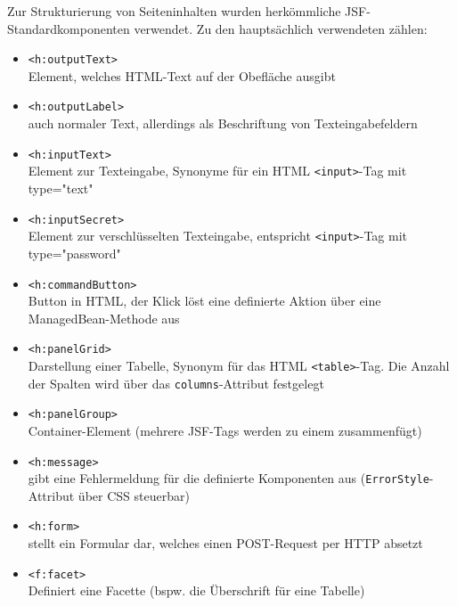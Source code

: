 Zur Strukturierung von Seiteninhalten wurden herkömmliche \ac{JSF}-Standardkomponenten verwendet.
Zu den hauptsächlich verwendeten zählen:
\begin{itemize}
  \item \texttt{<h:outputText>}\\
    Element, welches HTML-Text auf der Obefläche ausgibt 
  
  \item \texttt{<h:outputLabel>}\\
    auch normaler Text, allerdings als Beschriftung von Texteingabefeldern
      
  \item \texttt{<h:inputText>}\\
    Element zur Texteingabe, Synonyme für ein HTML \texttt{<input>}-Tag mit type="text"
  
  \item \texttt{<h:inputSecret>}\\
    Element zur verschlüsselten Texteingabe, entspricht \texttt{<input>}-Tag mit type="password"
  
  \item \texttt{<h:commandButton>}\\
    Button in HTML, der Klick löst eine definierte Aktion über eine ManagedBean-Methode aus

  \item \texttt{<h:panelGrid>}\\
    Darstellung einer Tabelle, Synonym für das HTML \texttt{<table>}-Tag. Die Anzahl der Spalten wird über das \texttt{columns}-Attribut festgelegt
  
  \item \texttt{<h:panelGroup>}\\
    Container-Element (mehrere JSF-Tags werden zu einem zusammenfügt)
  
  \item \texttt{<h:message>}\\
    gibt eine Fehlermeldung für die definierte Komponenten aus (\texttt{ErrorStyle}-Attribut über \ac{CSS} steuerbar)
  
  \item \texttt{<h:form>}\\
    stellt ein Formular dar, welches einen POST-Request per HTTP absetzt
  
  \item \texttt{<f:facet>}\\
    Definiert eine Facette (bspw. die Überschrift für eine Tabelle)
\end{itemize}

